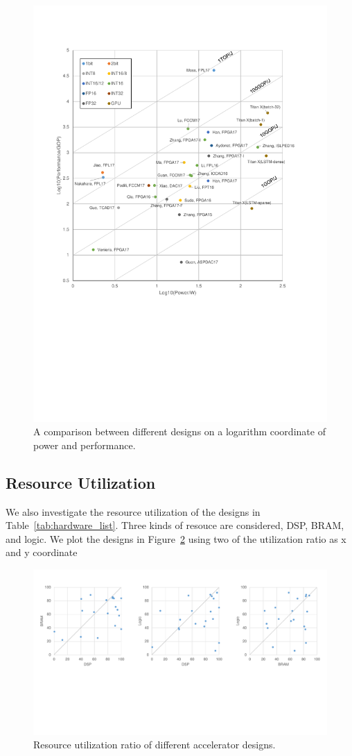 \begin{figure}[ht]
    \centering
    \includegraphics[width=1.0\columnwidth]{fig/efficiency.pdf}
    \caption{A comparison between different designs on a logarithm coordinate of power and performance. }
    \label{fig:efficiency}
\end{figure}

\subsection{Resource Utilization}
We also investigate the resource utilization of the designs in Table~\ref{tab:hardware_list}. Three kinds of resouce are considered, DSP, BRAM, and logic. We plot the designs in Figure~\ref{fig:resource} using two of the utilization ratio as x and y coordinate

\begin{figure}[ht]
    \centering
    \includegraphics[width=1.0\columnwidth]{fig/resource.pdf}
    \caption{Resource utilization ratio of different accelerator designs.}
    \label{fig:resource}
\end{figure}